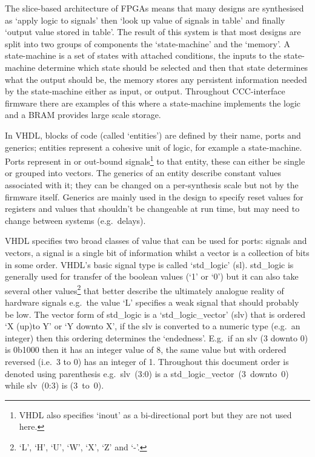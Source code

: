 The slice-based architecture of FPGAs means that many designs are synthesised as `apply logic to signals' then `look up value of signals in table' and finally `output value stored in table'. The result of this system is that most designs are split into two groups of components the `state-machine' and the `memory'. A state-machine is a set of states with attached conditions, the inputs to the state-machine determine which state should be selected and then that state determines what the output should be, the memory stores any persistent information needed by the state-machine either as input, or output. Throughout CCC-interface firmware there are examples of this where a state-machine implements the logic and a BRAM provides large scale storage.

In VHDL, blocks of code (called `entities') are defined by their name, ports and generics; entities represent a cohesive unit of logic, for example a state-machine. Ports represent in or out-bound signals\footnote{VHDL also specifies `inout' as a bi-directional port but they are not used here.} to that entity, these can either be single or grouped into vectors. The generics of an entity describe constant values associated with it; they can be changed on a per-synthesis scale but not by the firmware itself. Generics are mainly used in the design to specify reset values for registers and values that shouldn't be changeable at run time, but may need to change between systems (e.g.\ delays). 

VHDL specifies two broad classes of value that can be used for ports: signals and vectors, a signal is a single bit of information whilst a vector is a collection of bits in some order. VHDL's basic signal type is called `std\_logic' (sl). std\_logic is generally used for transfer of the boolean values (`1' or `0') but it can also take several other values\footnote{`L', `H', `U', `W', `X', `Z' and `-'.} that better describe the ultimately analogue reality of hardware signals e.g.\ the value `L' specifies a weak signal that should probably be low. The vector form of std\_logic is a `std\_logic\_vector' (slv) that is ordered `X (up)to Y' or `Y downto X', if the slv is converted to a numeric type (e.g.\ an integer) then this ordering determines the `endedness'. E.g.\ if an slv (3 downto 0) is 0b1000 then it has an integer value of 8, the same value but with ordered reversed (i.e.\ 3 to 0) has an integer of 1. Throughout this document order is denoted using parenthesis e.g.\ slv~(3:0) is a std\_logic\_vector~(3~downto~0) while slv~(0:3) is (3~to~0).
